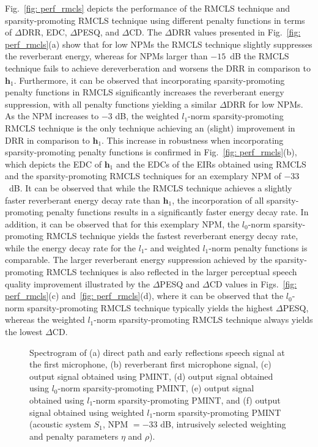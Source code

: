 \documentclass[10pt]{IEEEtran}
\begin{document}
Fig.~\ref{fig: perf_rmcls} depicts the performance of the RMCLS technique and sparsity-promoting RMCLS technique using different penalty functions in terms of $\Delta$DRR, EDC, $\Delta$PESQ, and $\Delta$CD. 
The $\Delta$DRR values presented in Fig.~\ref{fig: perf_rmcls}(a) show that for low NPMs the RMCLS technique slightly suppresses the reverberant energy, whereas for NPMs larger than $-15$~dB the RMCLS technique fails to achieve dereverberation and worsens the DRR in comparison to $\mathbf{h}_1$.
Furthermore, it can be observed that incorporating sparsity-promoting penalty functions in RMCLS significantly increases the reverberant energy suppression, with all penalty functions yielding a similar $\Delta$DRR for low NPMs.
As the NPM increases to $-3$ dB, the weighted $l_1$-norm sparsity-promoting RMCLS technique is the only technique achieving an (slight) improvement in DRR in comparison to $\mathbf{h}_1$. 
This increase in robustness when incorporating sparsity-promoting penalty functions is confirmed in Fig.~\ref{fig: perf_rmcls}(b), which depicts the EDC of $\mathbf{h}_1$ and the EDCs of the EIRs obtained using RMCLS and the sparsity-promoting RMCLS techniques for an exemplary NPM  of $-33$~dB.
It can be observed that while the RMCLS technique achieves a slightly faster reverberant energy decay rate than $\mathbf{h}_1$, the incorporation of all sparsity-promoting penalty functions results in a significantly faster energy decay rate.
In addition, it can be observed that for this exemplary NPM, the $l_0$-norm sparsity-promoting RMCLS technique yields the fastest reverberant energy decay rate, while the energy decay rate for the $l_1$- and weighted $l_1$-norm penalty functions is comparable.
The larger reverberant energy suppression achieved by the sparsity-promoting RMCLS techniques is also reflected in the larger perceptual speech quality improvement illustrated by the $\Delta$PESQ and $\Delta$CD values in Figs.~\ref{fig: perf_rmcls}(c) and~\ref{fig: perf_rmcls}(d), where it can be observed that the $l_0$-norm sparsity-promoting RMCLS technique typically yields the highest $\Delta$PESQ, whereas the weighted $l_1$-norm sparsity-promoting RMCLS technique always yields the lowest $\Delta$CD.
\begin{figure}[t!]
  \centering
  
  
\caption{Spectrogram of (a) direct path and early reflections speech signal at the first microphone, (b) reverberant first microphone signal, (c) output signal obtained using PMINT, (d) output signal obtained using $l_0$-norm sparsity-promoting PMINT, (e) output signal obtained using $l_1$-norm sparsity-promoting PMINT, and (f) output signal obtained using weighted $l_1$-norm sparsity-promoting PMINT (acoustic system $S_1$, NPM $= -33$ dB, intrusively selected weighting and penalty parameters $\eta$ and $\rho$).}
\label{fig: spec}
\end{figure}
\end{document}
